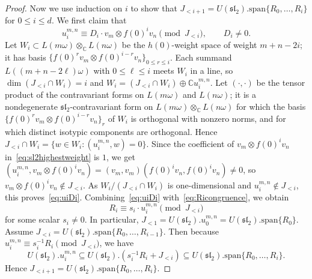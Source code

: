 \documentclass[12pt,a4paper,reqno]{amsart}
\numberwithin{equation}{section}
\theoremstyle{definition}
\renewcommand{\sl}{\mathfrak{sl}}
\newcommand{\C}{\mathbb{C}}
\def\spn{\mathrm{span}}
\def\om{\omega}
\def\o{\otimes}
\def\op{\oplus}
\def\ssq{\subseteq}
\def\ds{\dots}
\begin{document}
\begin{proof}
Now we use induction on $i$ to show that $J_{<i+1}=U(\sl_2).\spn\{R_0,\ds, R_i\}$ for $0\leq i\leq d$. We first claim that
\begin{equation}\label{eq:uiDi}
u_i^{m,n}\equiv D_i\cdot v_m\o f(0)^iv_n\pmod{J_{<i}},\qquad D_i\neq 0.
\end{equation}
Let $W_i\subset L(m\om)\o_\C L(n\om)$ be the $h(0)$-weight space of weight $m+n-2i$; it has basis $\{f(0)^rv_m\o f(0)^{i-r}v_n\}_{0\leq r\leq i}$. Each summand $L((m+n-2\ell)\om)$ with $0\leq \ell\leq i$ meets $W_i$ in a line, so $\dim (J_{<i}\cap W_i)=i$ and $W_i=(J_{<i}\cap W_i)\op \C u_i^{m,n}$. Let $(\cdot,\cdot)$ be the tensor product of the contravariant forms on $L(m\om)$ and $L(n\om)$; it is a nondegenerate $\sl_2$-contravariant form on $L(m\om)\o_\C L(n\om)$ for which the basis $\{f(0)^rv_m\o f(0)^{i-r}v_n\}_r$ of $W_i$ is orthogonal with nonzero norms, and for which distinct isotypic components are orthogonal. Hence $J_{<i}\cap W_i=\{w\in W_i: (u_i^{m,n},w)=0\}$. Since the coefficient of $v_m\o f(0)^iv_n$ in~\eqref{eq:sl2highestweight} is $1$, we get $(u_i^{m,n},v_m\o f(0)^iv_n)=(v_m,v_m)(f(0)^iv_n,f(0)^iv_n)\neq 0$, so $v_m\o f(0)^iv_n\notin J_{<i}$. As $W_i/(J_{<i}\cap W_i)$ is one-dimensional and $u_i^{m,n}\notin J_{<i}$, this proves~\eqref{eq:uiDi}. Combining~\eqref{eq:uiDi} with~\eqref{eq:Ricongruence}, we obtain \[R_i\equiv s_i\cdot u^{m,n}_i\pmod{J_{<i}}\] for some scalar $s_i\neq 0$. In particular, $J_{<1}=U(\sl_2).u_0^{m,n}=U(\sl_2).\spn\{R_0\}$. Assume $J_{<i}=U(\sl_2).\spn\{R_0,\ds, R_{i-1}\}$. Then
because $u_i^{m,n}\equiv s_i^{-1}R_i\pmod{J_{<i}}$, we have
\[U(\sl_2).u^{m,n}_i\ssq U(\sl_2).( s_i^{-1}R_i+J_{<i})\subseteq U(\sl_2).\spn\{R_0,\ds, R_i\}.\]
Hence $J_{<i+1}=U(\sl_2).\spn\{R_0,\ds, R_i\}$.
\end{proof}
\end{document}
